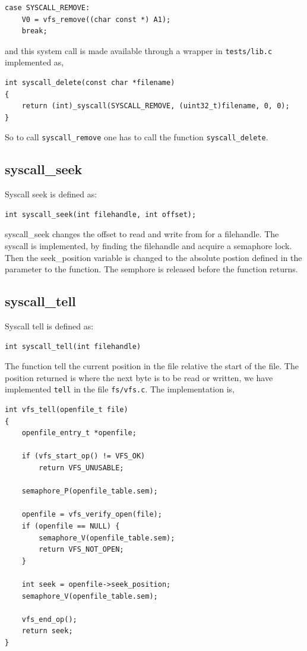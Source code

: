 \documentclass[11pt]{article}
\begin{document}
\begin{lstlisting}[style=customc]
case SYSCALL_REMOVE:
    V0 = vfs_remove((char const *) A1);
    break;
\end{lstlisting}

and this system call is made available through a wrapper in \texttt{tests/lib.c}
implemented as,

\begin{lstlisting}[style=customc]
int syscall_delete(const char *filename)
{
    return (int)_syscall(SYSCALL_REMOVE, (uint32_t)filename, 0, 0);
}
\end{lstlisting}

So to call \texttt{syscall\_remove} one has to call the function
\texttt{syscall\_delete}.



\subsection{syscall\_seek}
Syscall seek is defined as:
    \begin{lstlisting}[style=customc]
int syscall_seek(int filehandle, int offset);
    \end{lstlisting}

syscall\_seek changes the offset to read and write from for a filehandle.
The syscall is implemented, by finding the filehandle and acquire a semaphore lock. Then the seek\_position variable is changed to the absolute postion defined in the parameter to the function. The semphore is released before the function returns.


\subsection{syscall\_tell}
Syscall tell is defined as:
    \begin{lstlisting}[style=customc]
int syscall_tell(int filehandle)
    \end{lstlisting}
The function tell the current position in the file relative the start of the
file.  The position returned is where the next byte is to be read or written,
we have implemented \texttt{tell} in the file \texttt{fs/vfs.c}.  The
implementation is,

\begin{lstlisting}[style=customc]
int vfs_tell(openfile_t file)
{
    openfile_entry_t *openfile;

    if (vfs_start_op() != VFS_OK)
        return VFS_UNUSABLE;

    semaphore_P(openfile_table.sem);

    openfile = vfs_verify_open(file);
    if (openfile == NULL) {
        semaphore_V(openfile_table.sem);
        return VFS_NOT_OPEN;
    }

    int seek = openfile->seek_position;
    semaphore_V(openfile_table.sem);

    vfs_end_op();
    return seek;
}
\end{lstlisting}
\end{document}
